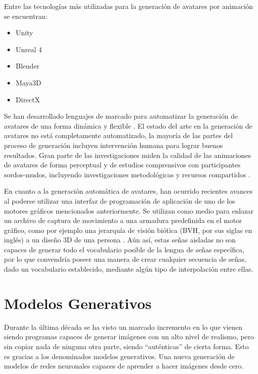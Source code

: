  Entre las tecnologías más utilizadas para la generación de avatares por animación se encuentran:
 \begin{itemize}
 \item  Unity
 \item Unreal 4
 \item Blender
 \item Maya3D 
 \item DirectX
 \end{itemize}  
 
 Se han desarrollado lenguajes de marcado para automatizar la generación de avatares de una forma dinámica y flexible  . El estado del arte en la generación de avatares no está completamente automatizado, la mayoría de las partes del proceso de generación incluyen intervención humana para lograr buenos resultados. Gran parte de las investigaciones miden la calidad de las animaciones de avatares de forma perceptual y de estudios comprensivos con participantes sordos-mudos, incluyendo investigaciones metodológicas y recursos compartidos  .
 
 En cuanto a la generación automática de avatares, han ocurrido recientes avances al poderse utilizar una interfaz de programación de aplicación de uno de los motores gráficos mencionados anteriormente. Se utilizan como medio para enlazar un archivo de captura de movimiento a una armadura predefinida en el motor gráfico, como por ejemplo una jerarquía de visión biótica (BVH, por sus siglas en inglés) a un diseño 3D de una persona . Aún así, estas señas aisladas no son capaces de generar todo el vocabulario posible de la lengua de señas específica, por lo que convendría poseer una manera de crear cualquier secuencia de señas, dado un vocabulario establecido, mediante algún tipo de interpolación entre ellas.

\section{Modelos Generativos}
Durante la última década se ha visto un marcado incremento en lo que vienen siendo programas capaces de generar imágenes con un alto nivel de realismo, pero sin copiar nada de ninguna otra parte, siendo  ``auténticas'' de cierta forma. Esto es gracias a los denominados modelos generativos. Una nueva generación de modelos de redes neuronales capaces de aprender a hacer imágenes desde cero.\\


